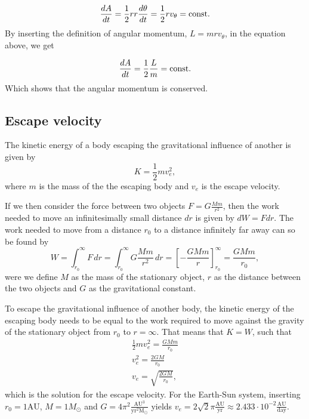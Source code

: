 \documentclass[../main.tex]{subfiles}
\begin{document}
\begin{align*}
    \frac{dA}{dt}=\frac{1}{2}rr\frac{d\theta}{dt}=\frac{1}{2}rv_{\theta}=\textnormal{const.}
\end{align*} By inserting the definition of angular momentum, \ensuremath{L=mrv_{\theta}}, in the equation above, we get

\begin{align*}
    \frac{dA}{dt}=\frac{1}{2}\frac{L}{m}=\textnormal{const.}
\end{align*} Which shows that the angular momentum is conserved. 

\subsection{Escape velocity}

The kinetic energy of a body escaping the gravitational influence of another is given by \begin{equation}
    K = \frac{1}{2} m v_{e}^{2},
\end{equation} where $m$ is the mass of the the escaping body and $v_e$ is the escape velocity. 

If we then consider the force between two objects $F = G \frac{Mm}{r^2}$, then the work needed to move an infinitesimally small distance $dr$ is given by $dW = Fdr$. The work needed to move from a distance $r_0$ to a distance infinitely far away can so be found by 
\begin{equation}
W = \int_{r_0}^{\infty} F\, dr = \int_{r_0}^{\infty} G \frac{Mm}{r^2}\, dr = \left[ -\frac{GMm}{r}  \right]_{r_0}^{\infty} = \frac{GMm}{r_0},
\end{equation} were we define $M$ as the mass of the stationary object, $r$ as the distance between the two objects and $G$ as the gravitational constant.

To escape the gravitational influence of another body, the kinetic energy of the escaping body needs to be equal to the work required to move against the gravity of the stationary object from $r_0$ to $r = \infty$. That means that $K = W$, such that 
\begin{align}
    \frac{1}{2} m v_{e}^{2} = \frac{GMm}{r_0} \\
    v_{e}^{2} = \frac{2GM}{r_0} \\
    v_{e} = \sqrt{\frac{2GM}{r_0}},
    \label{eq:escape-velocity}
\end{align}
which is the solution for the escape velocity. For the Earth-Sun system, inserting $r_0 = 1 \text{AU}$, $M = 1 M_\odot$ and $G = 4\pi^2 \frac{\text{AU}^3}{\text{yr}^2 \text{M}_\odot}$ yields $v_e = 2\sqrt{2} \pi\frac{\text{AU}}{\text{yr}}  \approx 2.433 \cdot 10^{-2} \frac{\text{AU}}{\text{day}}$.
\end{document}

